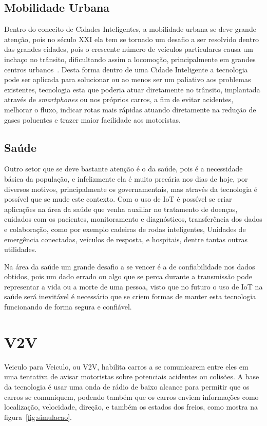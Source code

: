 \subsection{Mobilidade Urbana}
\label{subsec:mobilidadeurbana}
Dentro do conceito de Cidades Inteligentes, a mobilidade urbana se deve grande atenção, pois no século XXI ela tem se tornado um desafio a ser resolvido dentro das grandes cidades, pois o crescente número de veículos particulares causa um inchaço no trânsito, dificultando assim a locomoção, principalmente em grandes centros urbanos~\cite{gonccalomodelo}. Desta forma dentro de uma Cidade Inteligente a tecnologia pode ser aplicada para solucionar ou ao menos ser um paliativo aos problemas existentes, tecnologia esta que poderia atuar diretamente no trânsito, implantada através de \textit{smartphones} ou nos próprios carros, a fim de evitar acidentes, melhorar o fluxo, indicar rotas mais rápidas atuando diretamente na redução de gases poluentes e trazer maior facilidade aos motoristas.~\cite{gonccalomodelo}

\subsection{Saúde}
\label{subsec:saude}
Outro setor que se deve bastante atenção é o da saúde, pois é a necessidade básica da população, e infelizmente ela é muito precária nos dias de hoje, por diversos motivos, principalmente os governamentais, mas através da tecnologia é possível que se mude este contexto. Com o uso de IoT é possível se criar aplicações na área da saúde que venha auxiliar no tratamento de doenças, cuidados com os pacientes, monitoramento e diagnósticos, transferência dos dados e colaboração, como por exemplo cadeiras de rodas inteligentes, Unidades de emergência conectadas, veículos de resposta, e hospitais, dentre tantas outras utilidades.~\cite{convergenciadigital}

Na área da saúde um grande desafio a se vencer é a de confiabilidade nos dados obtidos, pois um dado errado ou algo que se perca durante a transmissão pode representar a vida ou a morte de uma pessoa, visto que no futuro o uso de IoT na saúde será inevitável é necessário que se criem formas de manter esta tecnologia funcionando de forma segura e confiável.~\cite{convergenciadigital}

\section{V2V}
\label{sec:v2v}
Veiculo para Veiculo, ou V2V, habilita carros a se comunicarem entre eles em uma tentativa de avisar motoristas sobre potenciais acidentes ou colisões. A base da tecnologia é usar uma onda de rádio de baixo alcance para permitir que os carros se comuniquem, podendo também que os carros enviem informações como localização, velocidade, direção, e também os estados dos freios, como mostra na figura~\ref{fig:simulacao}.

